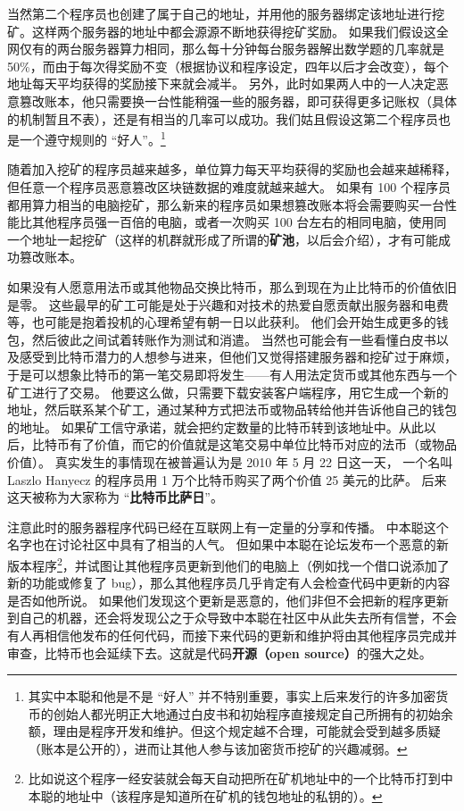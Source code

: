 当然第二个程序员也创建了属于自己的地址，并用他的服务器绑定该地址进行挖矿。这样两个服务器的地址中都会源源不断地获得挖矿奖励。 如果我们假设这全网仅有的两台服务器算力相同，那么每十分钟每台服务器解出数学题的几率就是 50\%，而由于每次得奖励不变（根据协议和程序设定，四年以后才会改变），每个地址每天平均获得的奖励接下来就会减半。 另外，此时如果两人中的一人决定恶意篡改账本，他只需要换一台性能稍强一些的服务器，即可获得更多记账权（具体的机制暂且不表），还是有相当的几率可以成功。我们姑且假设这第二个程序员也是一个遵守规则的 “好人”。\footnote{其实中本聪和他是不是 “好人” 并不特别重要，事实上后来发行的许多加密货币的创始人都光明正大地通过白皮书和初始程序直接规定自己所拥有的初始余额，理由是程序开发和维护。但这个规定越不合理，可能就会受到越多质疑（账本是公开的），进而让其他人参与该加密货币挖矿的兴趣减弱。}

随着加入挖矿的程序员越来越多，单位算力每天平均获得的奖励也会越来越稀释，但任意一个程序员恶意篡改区块链数据的难度就越来越大。 如果有 100 个程序员都用算力相当的电脑挖矿，那么新来的程序员如果想篡改账本将会需要购买一台性能比其他程序员强一百倍的电脑，或者一次购买 100 台左右的相同电脑，使用同一个地址一起挖矿（这样的机群就形成了所谓的\textbf{矿池}，以后会介绍），才有可能成功篡改账本。

如果没有人愿意用法币或其他物品交换比特币，那么到现在为止比特币的价值依旧是零。 这些最早的矿工可能是处于兴趣和对技术的热爱自愿贡献出服务器和电费等，也可能是抱着投机的心理希望有朝一日以此获利。 他们会开始生成更多的钱包，然后彼此之间试着转账作为测试和消遣。 当然也可能会有一些看懂白皮书以及感受到比特币潜力的人想参与进来，但他们又觉得搭建服务器和挖矿过于麻烦，于是可以想象比特币的第一笔交易即将发生——有人用法定货币或其他东西与一个矿工进行了交易。 他要这么做，只需要下载安装客户端程序，用它生成一个新的地址，然后联系某个矿工，通过某种方式把法币或物品转给他并告诉他自己的钱包的地址。 如果矿工信守承诺，就会把约定数量的比特币转到该地址中。从此以后，比特币有了价值，而它的价值就是这笔交易中单位比特币对应的法币（或物品价值）。 真实发生的事情现在被普遍认为是 2010 年 5 月 22 日这一天， 一个名叫 Laszlo Hanyecz 的程序员用 1 万个比特币购买了两个价值 25 美元的比萨。 后来这天被称为大家称为 “\textbf{比特币比萨日}”。

注意此时的服务器程序代码已经在互联网上有一定量的分享和传播。 中本聪这个名字也在讨论社区中具有了相当的人气。 但如果中本聪在论坛发布一个恶意的新版本程序\footnote{比如说这个程序一经安装就会每天自动把所在矿机地址中的一个比特币打到中本聪的地址中（该程序是知道所在矿机的钱包地址的私钥的）。}，并试图让其他程序员更新到他们的电脑上（例如找一个借口说添加了新的功能或修复了 bug），那么其他程序员几乎肯定有人会检查代码中更新的内容是否如他所说。 如果他们发现这个更新是恶意的，他们非但不会把新的程序更新到自己的机器，还会将发现公之于众导致中本聪在社区中从此失去所有信誉，不会有人再相信他发布的任何代码，而接下来代码的更新和维护将由其他程序员完成并审查，比特币也会延续下去。这就是代码\textbf{开源（open source）}的强大之处。

